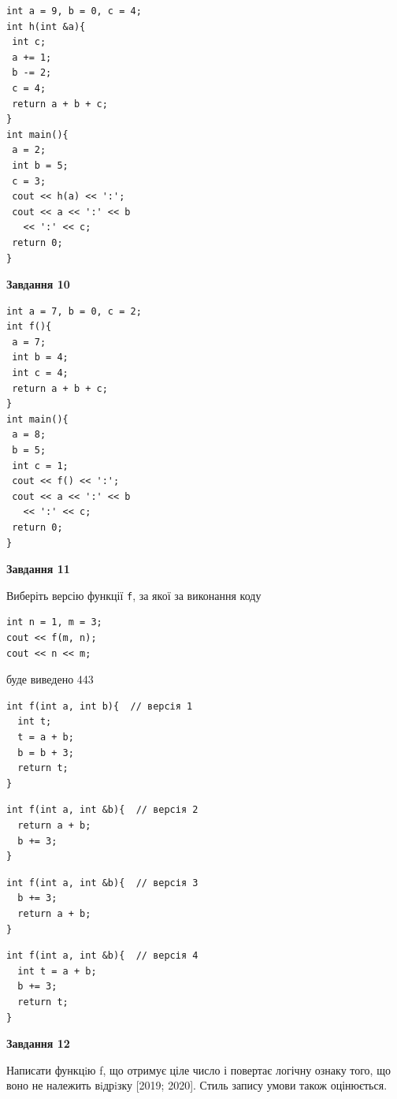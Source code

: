 \documentclass[12pt, ukrainian]{article}
\def\code#1{\Verb!#1!}
\begin{document}
{\begin {large}
\begin{minipage}[t]{7.0cm}
\begin{verbatim}
int a = 9, b = 0, c = 4;
int h(int &a){
 int c;
 a += 1;
 b -= 2;
 c = 4;
 return a + b + c;
}
int main(){
 a = 2;
 int b = 5;
 c = 3;
 cout << h(a) << ':';
 cout << a << ':' << b 
   << ':' << c;
 return 0;
}
\end{verbatim}



\begin{center}
\textbf{Завдання 10}
\end{center}
\vspace{-8mm}

\begin{verbatim}
int a = 7, b = 0, c = 2;
int f(){
 a = 7;
 int b = 4;
 int c = 4;
 return a + b + c;
}
int main(){
 a = 8;
 b = 5;
 int c = 1;
 cout << f() << ':';
 cout << a << ':' << b 
   << ':' << c;
 return 0;
}
\end{verbatim}

\end{minipage}
\vline \hspace{1mm}
\begin{minipage}[t]{11.0cm}

\begin{center}
\textbf{Завдання 11}
\end{center}
Виберіть версію функції \code{f}, за якої за виконання коду
\begin{verbatim}
int n = 1, m = 3;
cout << f(m, n);
cout << n << m;
\end{verbatim}

буде виведено 443

\begin{verbatim}
int f(int a, int b){  // версія 1
  int t;
  t = a + b;
  b = b + 3;
  return t;
}
\end{verbatim}

\vspace{-8mm}\begin{verbatim}
int f(int a, int &b){  // версія 2
  return a + b;
  b += 3;
}
\end{verbatim}

\vspace{-8mm}\begin{verbatim}
int f(int a, int &b){  // версія 3
  b += 3;
  return a + b;
}
\end{verbatim}

\vspace{-8mm}\begin{verbatim}
int f(int a, int &b){  // версія 4
  int t = a + b;
  b += 3;
  return t;
}
\end{verbatim}



\begin{center}
\textbf{Завдання 12}
\end{center}

Написати функцiю f, що отримує ціле число і повертає логічну ознаку того, що воно не належить вiдрiзку [2019; 2020]. Стиль запису умови також оцінюється.\par

\end{minipage}

\end {large}}
\end{document}
